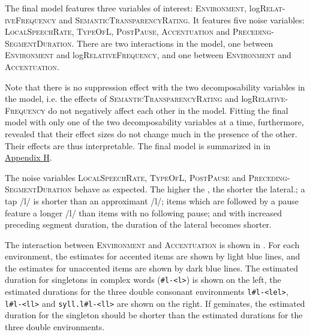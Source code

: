 The final model features three variables of interest: \textsc{Environment}, log\textsc{Relat-iveFrequency} and \textsc{SemanticTransparencyRating}. It features five noise variables: \textsc{LocalSpeechRate}, \textsc{TypeOfL}, \textsc{PostPause}, \textsc{Accentuation} and \textsc{Preceding-SegmentDuration}. 
There are two interactions in the model, one between \textsc{Environment} and log\textsc{RelativeFrequency}, and one between \textsc{Environment} and \textsc{Accentuation}. 

Note that there is no suppression effect with the two decomposability variables in the model, i.e. the effects of  \textsc{SemanticTransparencyRating} and log\textsc{Relative- Frequency} do not negatively affect each other in the model. Fitting the final model with only one of the two decomposability variables at a time, furthermore, revealed that their effect sizes do not change much in the presence of the other. Their effects are thus interpretable.
The final model is summarized in  in \hyperref[Appendix H: Model Summaries Experiment]{Appendix H}.

The noise variables \textsc{LocalSpeechRate}, \textsc{TypeOfL}, \textsc{PostPause} and \textsc{Preceding- SegmentDuration} behave as expected. The higher the , the shorter the lateral.; a tap /l/ is shorter than an approximant /l/; items which are followed by a pause feature a longer /l/ than items with no following pause; and with increased preceding segment duration, the duration of the lateral becomes shorter.



The interaction between \textsc{Environment} and \textsc{Accentuation} is shown in . 
For each environment, the estimates for accented items are shown by light blue lines, and the estimates for unaccented items are shown by dark blue lines. The estimated duration for singletons in complex words (\texttt{\#l-<l>}) is shown on the left, the estimated durations for the three double consonant environments \texttt{l\#l-<lel>}, \texttt{l\#l-<ll>} and \texttt{syll.l\#l-<ll>} are shown on the right. If  geminates, the estimated duration for the singleton should be shorter than the estimated durations for the three double environments. 


